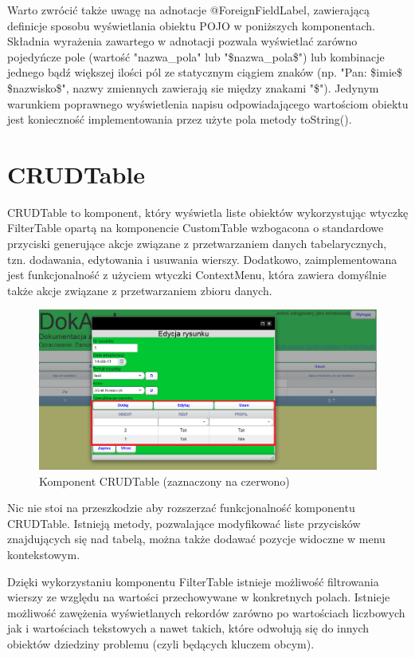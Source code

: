 Warto zwrócić także uwagę na adnotacje @ForeignFieldLabel, zawierającą definicje sposobu wyświetlania obiektu POJO w poniższych komponentach. Składnia wyrażenia zawartego w adnotacji pozwala wyświetlać zarówno pojedyńcze pole (wartość "nazwa\_pola" lub "\$nazwa\_pola\$") lub kombinacje jednego bądź większej ilości pól ze statycznym ciągiem znaków (np. "Pan: \$imie\$ \$nazwisko\$", nazwy zmiennych zawierają sie między znakami "\$"). Jedynym warunkiem poprawnego wyświetlenia napisu odpowiadającego wartościom obiektu jest konieczność implementowania przez użyte pola metody toString().

\section{CRUDTable}
CRUDTable to komponent, który wyświetla liste obiektów wykorzystując wtyczkę FilterTable opartą na komponencie CustomTable wzbogacona o standardowe przyciski generujące akcje związane z przetwarzaniem danych tabelarycznych, tzn. dodawania, edytowania i usuwania wierszy. Dodatkowo, zaimplementowana jest funkcjonalność z użyciem wtyczki ContextMenu, która zawiera domyślnie także akcje związane z przetwarzaniem zbioru danych.

\begin{figure} [H]
    \begin{center}
	\includegraphics[scale=.6]{img/crudTable.png}
	\caption{Komponent CRUDTable (zaznaczony na czerwono)}
	\label{crudTable}
    \end{center}
\end{figure}

Nic nie stoi na przeszkodzie aby rozszerzać funkcjonalność komponentu CRUDTable. Istnieją metody, pozwalające modyfikować liste przycisków znajdujących się nad tabelą, można także dodawać pozycje widoczne w menu kontekstowym.

Dzięki wykorzystaniu komponentu FilterTable istnieje możliwość filtrowania wierszy ze względu na wartości przechowywane w konkretnych polach. Istnieje możliwość zawężenia wyświetlanych rekordów zarówno po wartościach liczbowych jak i wartościach tekstowych a nawet takich, które odwołują się do innych obiektów dziedziny problemu (czyli będących kluczem obcym).

